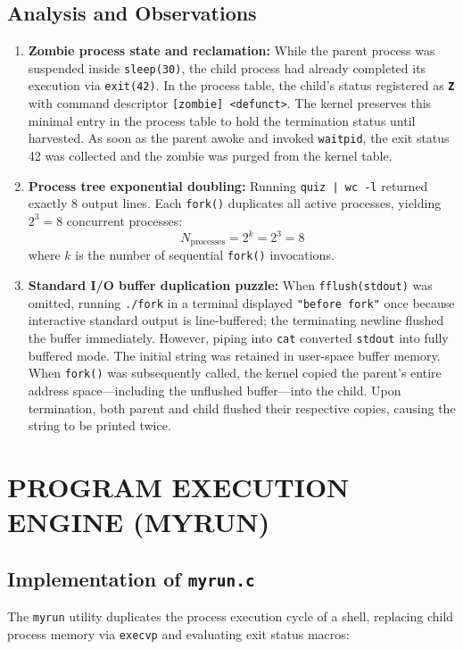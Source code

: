 \documentclass[12pt,a4paper]{report}
\numberwithin{equation}{chapter}
\numberwithin{figure}{chapter}
\numberwithin{table}{chapter}
\begin{document}
\section{Analysis and Observations}
\begin{enumerate}
    \item \textbf{Zombie process state and reclamation:}
    While the parent process was suspended inside \texttt{sleep(30)}, the child process had already completed its execution via \texttt{exit(42)}. In the process table, the child's status registered as \textbf{\texttt{Z}} with command descriptor \texttt{[zombie] <defunct>}. The kernel preserves this minimal entry in the process table to hold the termination status until harvested. As soon as the parent awoke and invoked \texttt{waitpid}, the exit status 42 was collected and the zombie was purged from the kernel table.
    \item \textbf{Process tree exponential doubling:}
    Running \texttt{quiz | wc -l} returned exactly 8 output lines. Each \texttt{fork()} duplicates all active processes, yielding $2^3 = 8$ concurrent processes:
    \begin{equation}
        N_{\text{processes}} = 2^k = 2^3 = 8
    \end{equation}
    where $k$ is the number of sequential \texttt{fork()} invocations.
    \item \textbf{Standard I/O buffer duplication puzzle:}
    When \texttt{fflush(stdout)} was omitted, running \texttt{./fork} in a terminal displayed \texttt{"before fork"} once because interactive standard output is line-buffered; the terminating newline flushed the buffer immediately. However, piping into \texttt{cat} converted \texttt{stdout} into fully buffered mode. The initial string was retained in user-space buffer memory. When \texttt{fork()} was subsequently called, the kernel copied the parent's entire address space—including the unflushed buffer—into the child. Upon termination, both parent and child flushed their respective copies, causing the string to be printed twice.
\end{enumerate}

\chapter{PROGRAM EXECUTION ENGINE (MYRUN)}

\section{Implementation of \texttt{myrun.c}}
The \texttt{myrun} utility duplicates the process execution cycle of a shell, replacing child process memory via \texttt{execvp} and evaluating exit status macros:
\end{document}
